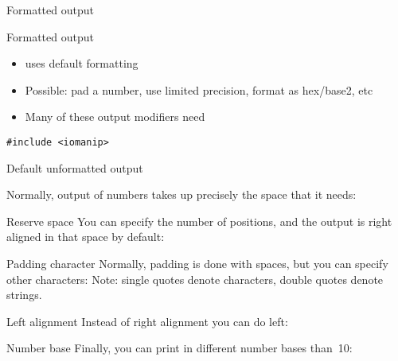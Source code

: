 
 {Formatted output}

\begin{block}{Formatted output}
  \label{sl:cformat}
  \begin{itemize}
  \item {} uses default formatting
  \item Possible: pad a number, use limited precision, format as hex/base2, etc
  \item 
    Many of these output modifiers need
  \end{itemize}
\begin{lstlisting}
#include <iomanip>
\end{lstlisting}
\end{block}

\begin{slide}{Default unformatted output}
  \label{sl:unformat}
\end{slide}

Normally, output of numbers takes up precisely the space that it needs:

\begin{block}{Reserve space}
  \label{sl:io-setw}
  You can specify the number of positions, and the output is right
  aligned in that space by default:
\end{block}

\begin{block}{Padding character}
  \label{sl:io-fill}
  Normally, padding is done with spaces, but you can specify other characters:
Note: single quotes denote characters, double quotes denote strings.
\end{block}

\begin{block}{Left alignment}
  \label{sl:io-left}
  Instead of right alignment you can do left:
\end{block}

\begin{block}{Number base}
  \label{sl:io-base}
  Finally, you can print in different number bases than~10:
\end{block}

